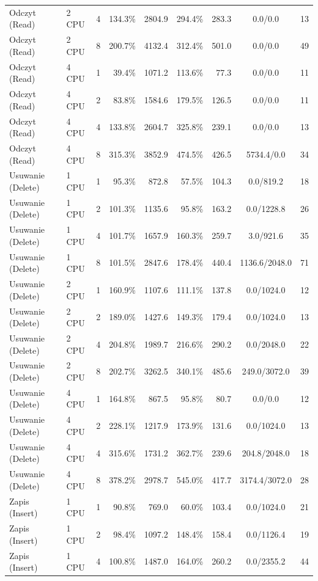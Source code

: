 \begin{table}[ht]
{\begin{tabular}{llcrrrrcc}
Odczyt (Read) & 2 CPU & 4 & 134.3\% & 2804.9 & 294.4\% & 283.3 & 0.0/0.0 & 13 \\
Odczyt (Read) & 2 CPU & 8 & 200.7\% & 4132.4 & 312.4\% & 501.0 & 0.0/0.0 & 49 \\
Odczyt (Read) & 4 CPU & 1 & 39.4\% & 1071.2 & 113.6\% & 77.3 & 0.0/0.0 & 11 \\
Odczyt (Read) & 4 CPU & 2 & 83.8\% & 1584.6 & 179.5\% & 126.5 & 0.0/0.0 & 11 \\
Odczyt (Read) & 4 CPU & 4 & 133.8\% & 2604.7 & 325.8\% & 239.1 & 0.0/0.0 & 13 \\
Odczyt (Read) & 4 CPU & 8 & 315.3\% & 3852.9 & 474.5\% & 426.5 & 5734.4/0.0 & 34 \\
Usuwanie (Delete) & 1 CPU & 1 & 95.3\% & 872.8 & 57.5\% & 104.3 & 0.0/819.2 & 18 \\
Usuwanie (Delete) & 1 CPU & 2 & 101.3\% & 1135.6 & 95.8\% & 163.2 & 0.0/1228.8 & 26 \\
Usuwanie (Delete) & 1 CPU & 4 & 101.7\% & 1657.9 & 160.3\% & 259.7 & 3.0/921.6 & 35 \\
Usuwanie (Delete) & 1 CPU & 8 & 101.5\% & 2847.6 & 178.4\% & 440.4 & 1136.6/2048.0 & 71 \\
Usuwanie (Delete) & 2 CPU & 1 & 160.9\% & 1107.6 & 111.1\% & 137.8 & 0.0/1024.0 & 12 \\
Usuwanie (Delete) & 2 CPU & 2 & 189.0\% & 1427.6 & 149.3\% & 179.4 & 0.0/1024.0 & 13 \\
Usuwanie (Delete) & 2 CPU & 4 & 204.8\% & 1989.7 & 216.6\% & 290.2 & 0.0/2048.0 & 22 \\
Usuwanie (Delete) & 2 CPU & 8 & 202.7\% & 3262.5 & 340.1\% & 485.6 & 249.0/3072.0 & 39 \\
Usuwanie (Delete) & 4 CPU & 1 & 164.8\% & 867.5 & 95.8\% & 80.7 & 0.0/0.0 & 12 \\
Usuwanie (Delete) & 4 CPU & 2 & 228.1\% & 1217.9 & 173.9\% & 131.6 & 0.0/1024.0 & 13 \\
Usuwanie (Delete) & 4 CPU & 4 & 315.6\% & 1731.2 & 362.7\% & 239.6 & 204.8/2048.0 & 18 \\
Usuwanie (Delete) & 4 CPU & 8 & 378.2\% & 2978.7 & 545.0\% & 417.7 & 3174.4/3072.0 & 28 \\
Zapis (Insert) & 1 CPU & 1 & 90.8\% & 769.0 & 60.0\% & 103.4 & 0.0/1024.0 & 21 \\
Zapis (Insert) & 1 CPU & 2 & 98.4\% & 1097.2 & 148.4\% & 158.4 & 0.0/1126.4 & 19 \\
Zapis (Insert) & 1 CPU & 4 & 100.8\% & 1487.0 & 164.0\% & 260.2 & 0.0/2355.2 & 44 \\

\end{tabular}}
\end{table}
